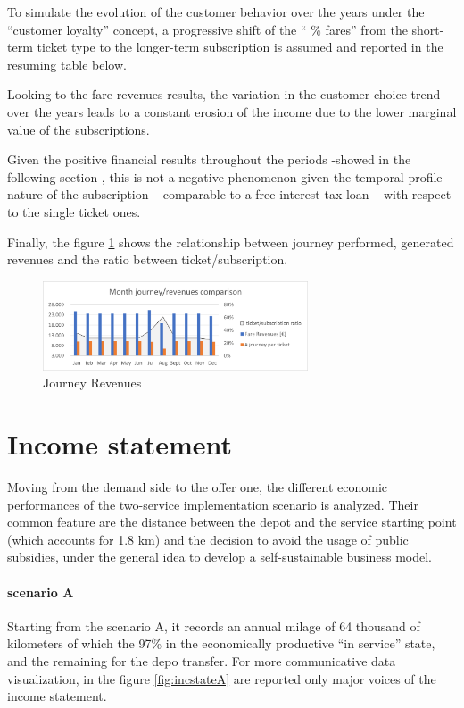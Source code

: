 To simulate the evolution of the customer behavior over the years under the “customer loyalty” concept, a progressive shift of the “ \% fares” from the short-term ticket type to the longer-term subscription is assumed and reported in the resuming table below.

Looking to the fare revenues results, the variation in the customer choice trend over the years leads to a constant erosion of the income due to the lower marginal value of the subscriptions. 

Given the positive financial results throughout the periods -showed in the following section-, this is not a negative phenomenon given the temporal profile nature of the subscription – comparable to a free interest tax loan – with respect to the single ticket ones. 

Finally, the figure \ref{fig:j_revenues} shows the relationship between journey performed, generated revenues and the ratio between ticket/subscription.

\begin{figure}[h]
    \centering
    \includegraphics[width=0.7\textwidth]{Images/financial/journey_revenues.png}
    \caption{Journey Revenues}
    \label{fig:j_revenues}
\end{figure}
\newpage
\section{Income statement}
Moving from the demand side to the offer one, the different economic performances of the two-service implementation scenario is analyzed. Their common feature are the distance between the depot and the service starting point (which accounts for 1.8 km) and the decision to avoid the usage of public subsidies, under the general idea to develop a self-sustainable business model.

\paragraph{scenario A}
Starting from the scenario A, it records an annual milage of 64 thousand of kilometers of which the 97\% in the economically productive “in service” state, and the remaining for the depo transfer. For more communicative data visualization, in the figure \ref{fig:incstateA} are reported only major voices of the income statement.

